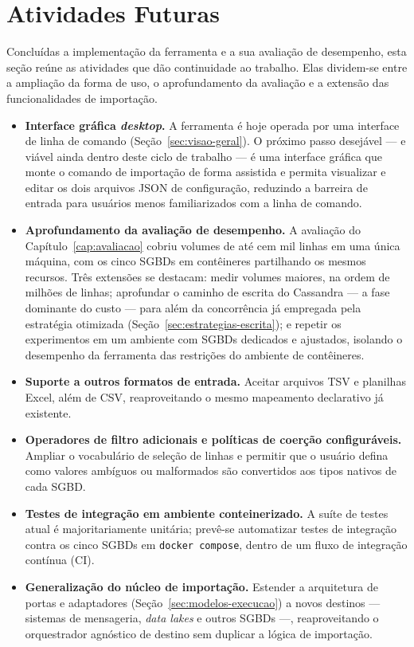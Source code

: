 \chapter{Atividades Futuras}
\label{cap:futuros}

Concluídas a implementação da ferramenta e a sua avaliação de desempenho, esta seção
reúne as atividades que dão continuidade ao trabalho. Elas dividem-se entre a ampliação da
forma de uso, o aprofundamento da avaliação e a extensão das funcionalidades de importação.

\begin{itemize}
  \item \textbf{Interface gráfica \textit{desktop}.} A ferramenta é hoje operada por uma
        interface de linha de comando (Seção~\ref{sec:visao-geral}). O próximo passo
        desejável --- e viável ainda dentro deste ciclo de trabalho --- é uma interface
        gráfica que monte o comando de importação de forma assistida e permita visualizar e
        editar os dois arquivos JSON de configuração, reduzindo a barreira de entrada para
        usuários menos familiarizados com a linha de comando.

  \item \textbf{Aprofundamento da avaliação de desempenho.} A avaliação do
        Capítulo~\ref{cap:avaliacao} cobriu volumes de até cem mil linhas em uma única
        máquina, com os cinco SGBDs em contêineres partilhando os mesmos recursos. Três
        extensões se destacam: medir volumes maiores, na ordem de milhões de linhas;
        aprofundar o caminho de escrita do Cassandra --- a fase dominante do custo --- para
        além da concorrência já empregada pela estratégia otimizada
        (Seção~\ref{sec:estrategias-escrita}); e repetir os experimentos em um ambiente com
        SGBDs dedicados e ajustados, isolando o desempenho da ferramenta das restrições do
        ambiente de contêineres.

  \item \textbf{Suporte a outros formatos de entrada.} Aceitar arquivos TSV e planilhas
        Excel, além de CSV, reaproveitando o mesmo mapeamento declarativo já existente.

  \item \textbf{Operadores de filtro adicionais e políticas de coerção configuráveis.}
        Ampliar o vocabulário de seleção de linhas e permitir que o usuário defina como
        valores ambíguos ou malformados são convertidos aos tipos nativos de cada SGBD.

  \item \textbf{Testes de integração em ambiente conteinerizado.} A suíte de testes atual é
        majoritariamente unitária; prevê-se automatizar testes de integração contra os cinco
        SGBDs em \texttt{docker compose}, dentro de um fluxo de integração contínua (CI).

  \item \textbf{Generalização do núcleo de importação.} Estender a arquitetura de portas e
        adaptadores (Seção~\ref{sec:modelos-execucao}) a novos destinos --- sistemas de
        mensageria, \textit{data lakes} e outros SGBDs ---, reaproveitando o orquestrador
        agnóstico de destino sem duplicar a lógica de importação.
\end{itemize}
